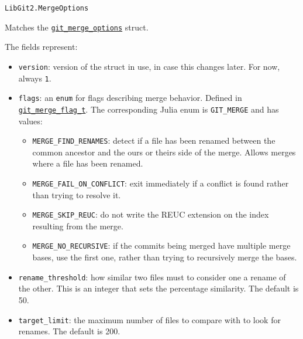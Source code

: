 \begin{adjustwidth}{2em}{0pt}


\begin{verbatim}
LibGit2.MergeOptions
\end{verbatim}

Matches the \href{https://libgit2.org/libgit2/\#HEAD/type/git\_merge\_options}{\texttt{git\_merge\_options}} struct.

The fields represent:

\begin{itemize}
\item \texttt{version}: version of the struct in use, in case this changes later. For now, always \texttt{1}.


\item \texttt{flags}: an \texttt{enum} for flags describing merge behavior.  Defined in \href{https://github.com/libgit2/libgit2/blob/HEAD/include/git2/merge.h\#L95}{\texttt{git\_merge\_flag\_t}}.  The corresponding Julia enum is \texttt{GIT\_MERGE} and has values:

\begin{itemize}
\item \texttt{MERGE\_FIND\_RENAMES}: detect if a file has been renamed between the common ancestor and the {\textquotedbl}ours{\textquotedbl} or {\textquotedbl}theirs{\textquotedbl} side of the merge. Allows merges where a file has been renamed.


\item \texttt{MERGE\_FAIL\_ON\_CONFLICT}: exit immediately if a conflict is found rather than trying to resolve it.


\item \texttt{MERGE\_SKIP\_REUC}: do not write the REUC extension on the index resulting from the merge.


\item \texttt{MERGE\_NO\_RECURSIVE}: if the commits being merged have multiple merge bases, use the first one, rather than trying to recursively merge the bases.

\end{itemize}

\item \texttt{rename\_threshold}: how similar two files must to consider one a rename of the other. This is an integer that sets the percentage similarity. The default is 50.


\item \texttt{target\_limit}: the maximum number of files to compare with to look for renames. The default is 200.



\end{itemize}
\end{adjustwidth}
